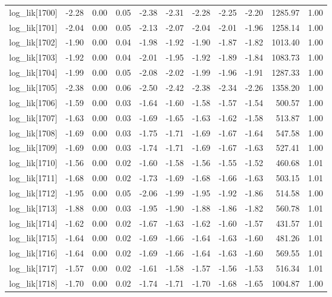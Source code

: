 \begin{table}[ht]
\begin{tabular}{rrrrrrrrrrr}
  log\_lik[1700] & -2.28 & 0.00 & 0.05 & -2.38 & -2.31 & -2.28 & -2.25 & -2.20 & 1285.97 & 1.00 \\ 
  log\_lik[1701] & -2.04 & 0.00 & 0.05 & -2.13 & -2.07 & -2.04 & -2.01 & -1.96 & 1258.14 & 1.00 \\ 
  log\_lik[1702] & -1.90 & 0.00 & 0.04 & -1.98 & -1.92 & -1.90 & -1.87 & -1.82 & 1013.40 & 1.00 \\ 
  log\_lik[1703] & -1.92 & 0.00 & 0.04 & -2.01 & -1.95 & -1.92 & -1.89 & -1.84 & 1083.73 & 1.00 \\ 
  log\_lik[1704] & -1.99 & 0.00 & 0.05 & -2.08 & -2.02 & -1.99 & -1.96 & -1.91 & 1287.33 & 1.00 \\ 
  log\_lik[1705] & -2.38 & 0.00 & 0.06 & -2.50 & -2.42 & -2.38 & -2.34 & -2.26 & 1358.20 & 1.00 \\ 
  log\_lik[1706] & -1.59 & 0.00 & 0.03 & -1.64 & -1.60 & -1.58 & -1.57 & -1.54 & 500.57 & 1.00 \\ 
  log\_lik[1707] & -1.63 & 0.00 & 0.03 & -1.69 & -1.65 & -1.63 & -1.62 & -1.58 & 513.87 & 1.00 \\ 
  log\_lik[1708] & -1.69 & 0.00 & 0.03 & -1.75 & -1.71 & -1.69 & -1.67 & -1.64 & 547.58 & 1.00 \\ 
  log\_lik[1709] & -1.69 & 0.00 & 0.03 & -1.74 & -1.71 & -1.69 & -1.67 & -1.63 & 527.41 & 1.00 \\ 
  log\_lik[1710] & -1.56 & 0.00 & 0.02 & -1.60 & -1.58 & -1.56 & -1.55 & -1.52 & 460.68 & 1.01 \\ 
  log\_lik[1711] & -1.68 & 0.00 & 0.02 & -1.73 & -1.69 & -1.68 & -1.66 & -1.63 & 503.15 & 1.01 \\ 
  log\_lik[1712] & -1.95 & 0.00 & 0.05 & -2.06 & -1.99 & -1.95 & -1.92 & -1.86 & 514.58 & 1.00 \\ 
  log\_lik[1713] & -1.88 & 0.00 & 0.03 & -1.95 & -1.90 & -1.88 & -1.86 & -1.82 & 560.78 & 1.01 \\ 
  log\_lik[1714] & -1.62 & 0.00 & 0.02 & -1.67 & -1.63 & -1.62 & -1.60 & -1.57 & 431.57 & 1.01 \\ 
  log\_lik[1715] & -1.64 & 0.00 & 0.02 & -1.69 & -1.66 & -1.64 & -1.63 & -1.60 & 481.26 & 1.01 \\ 
  log\_lik[1716] & -1.64 & 0.00 & 0.02 & -1.69 & -1.66 & -1.64 & -1.63 & -1.60 & 569.55 & 1.01 \\ 
  log\_lik[1717] & -1.57 & 0.00 & 0.02 & -1.61 & -1.58 & -1.57 & -1.56 & -1.53 & 516.34 & 1.01 \\ 
  log\_lik[1718] & -1.70 & 0.00 & 0.02 & -1.74 & -1.71 & -1.70 & -1.68 & -1.65 & 1004.87 & 1.00 \\ 

\end{tabular}
\end{table}
